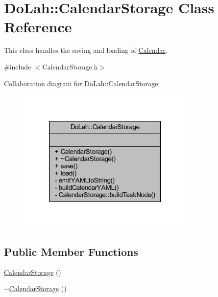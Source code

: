 \hypertarget{class_do_lah_1_1_calendar_storage}{}\section{Do\+Lah\+:\+:Calendar\+Storage Class Reference}
\label{class_do_lah_1_1_calendar_storage}


This class handles the saving and loading of \hyperlink{class_do_lah_1_1_calendar}{Calendar}.  




{\ttfamily \#include $<$Calendar\+Storage.\+h$>$}



Collaboration diagram for Do\+Lah\+:\+:Calendar\+Storage\+:\nopagebreak
\begin{figure}[H]
\begin{center}
\leavevmode
\includegraphics[width=250pt]{class_do_lah_1_1_calendar_storage__coll__graph}
\end{center}
\end{figure}
\subsection*{Public Member Functions}
\begin{DoxyCompactItemize}
\item 
\hyperlink{class_do_lah_1_1_calendar_storage_a803d9eccc464d755008ece41b166be9b}{Calendar\+Storage} ()
\item 
\hyperlink{class_do_lah_1_1_calendar_storage_afadcfb4f199649bf06664ddf669aa4b8}{$\sim$\+Calendar\+Storage} ()
\end{DoxyCompactItemize}
